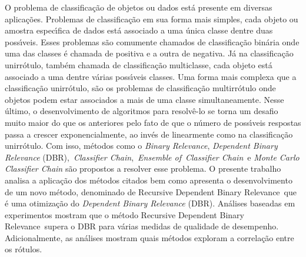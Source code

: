\documentclass[brazil,ruledheader]{abnt}
\newcommand{\CC}{\textit{Classifier Chain}}
\newcommand{\ECC}{\textit{Ensemble of}~\CC}
\newcommand{\MRLM}{Recursive Dependent Binary Relevance}
\begin{document}
\begin{resumo}
O problema de classifica\c c\~ao de objetos ou dados est\'a presente em diversas aplica\c c\~oes.
Problemas de classifica\c c\~ao em sua forma mais simples, 
cada objeto ou amostra espec\'\i fica de dados est\'a associado
a uma \'unica classe dentre duas poss\'\i veis.
Esses problemas s\~ao comumente chamados de classifica\c c\~ao bin\'aria onde uma das
classes \'e chamada de positiva e a outra de negativa. J\'a na classifica\c c\~ao unirr\'otulo, tamb\'em chamada
de classifica\c c\~ao multiclasse, cada objeto est\'a associado a uma dentre 
v\'arias poss\'\i veis classes.
Uma forma mais complexa que a classifica\c c\~ao unirr\'otulo,
s\~ao os problemas de classifica\c c\~ao multirr\' otulo onde 
objetos podem estar associados a mais de uma classe simultaneamente.
Nesse \'ultimo, o desenvolvimento de algoritmos para resolv\^e-lo se torna
um desafio muito maior do que os anteriores
pelo fato de que o n\'umero de poss\'\i veis respostas passa a crescer exponencialmente,
ao inv\'es de linearmente como na classifica\c c\~ao unirr\'otulo.
Com isso, m\'etodos como o \textit{Binary Relevance},
\textit{Dependent Binary Relevance} (DBR),~\CC,~\ECC~e \textit{Monte Carlo Classifier Chain} 
s\~ao propostos a resolver esse problema.
O presente trabalho analisa
a aplica\c c\~ao dos m\'etodos citados bem como apresenta o desenvolvimento de um
novo m\'etodo, denominado de \MRLM~que \'e uma otimiza\c c\~ao do \textit{Dependent Binary Relevance} (DBR).
An\'alises baseadas em experimentos mostram que o m\'etodo \MRLM~supera o DBR para v\'arias medidas de
qualidade de desempenho. Adicionalmente, as an\'alises mostram quais m\'etodos exploram a correla\c c\~ao entre
os r\'otulos.
\end{resumo}
% 
\tableofcontents{}

\listoftables







\anexo
\end{document}
